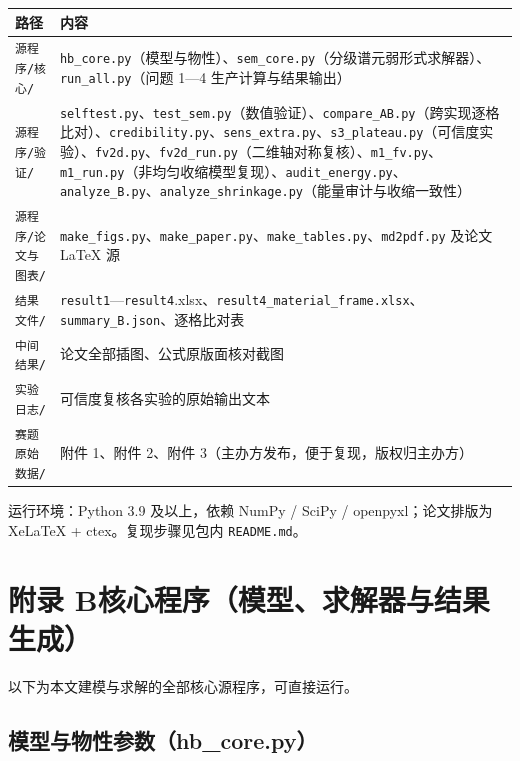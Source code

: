 \documentclass[12pt,a4paper]{ctexart}
\begin{document}
\begin{center}
\small
\begin{tabular}{@{}p{5.0cm}p{8.6cm}@{}}
\toprule
路径 & 内容 \\
\midrule
\texttt{源程序/核心/} & \texttt{hb\_core.py}（模型与物性）、\texttt{sem\_core.py}（分级谱元弱形式求解器）、\texttt{run\_all.py}（问题 1—4 生产计算与结果输出） \\
\texttt{源程序/验证/} & \texttt{selftest.py}、\texttt{test\_sem.py}（数值验证）、\texttt{compare\_AB.py}（跨实现逐格比对）、\texttt{credibility.py}、\texttt{sens\_extra.py}、\texttt{s3\_plateau.py}（可信度实验）、\texttt{fv2d.py}、\texttt{fv2d\_run.py}（二维轴对称复核）、\texttt{m1\_fv.py}、\texttt{m1\_run.py}（非均匀收缩模型复现）、\texttt{audit\_energy.py}、\texttt{analyze\_B.py}、\texttt{analyze\_shrinkage.py}（能量审计与收缩一致性） \\
\texttt{源程序/论文与图表/} & \texttt{make\_figs.py}、\texttt{make\_paper.py}、\texttt{make\_tables.py}、\texttt{md2pdf.py} 及论文 \LaTeX{} 源 \\
\texttt{结果文件/} & \texttt{result1}—\texttt{result4}.xlsx、\texttt{result4\_material\_frame.xlsx}、\texttt{summary\_B.json}、逐格比对表 \\
\texttt{中间结果/} & 论文全部插图、公式原版面核对截图 \\
\texttt{实验日志/} & 可信度复核各实验的原始输出文本 \\
\texttt{赛题原始数据/} & 附件 1、附件 2、附件 3（主办方发布，便于复现，版权归主办方） \\
\bottomrule
\end{tabular}
\end{center}

\noindent 运行环境：Python 3.9 及以上，依赖 NumPy / SciPy / openpyxl；论文排版为 XeLaTeX{} + ctex。复现步骤见包内 \texttt{README.md}。

\newpage
\section*{附录 B\quad 核心程序（模型、求解器与结果生成）}

以下为本文建模与求解的全部核心源程序，可直接运行。

\subsection*{模型与物性参数（hb\_core.py）}

\end{document}
